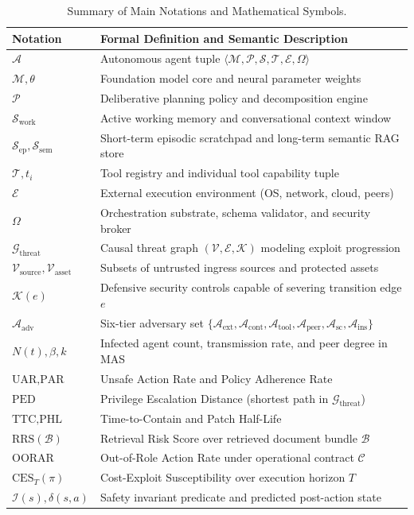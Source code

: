 \begin{table}[t]
\centering
\caption{Summary of Main Notations and Mathematical Symbols.}
\label{tab:nomenclature}
\footnotesize
\begin{tabularx}{\columnwidth}{l X}
\toprule
\textbf{Notation} & \textbf{Formal Definition and Semantic Description} \\
\midrule
$\mathcal{A}$ & Autonomous agent tuple $\langle \mathcal{M}, \mathcal{P}, \mathcal{S}, \mathcal{T}, \mathcal{E}, \Omega \rangle$ \\
$\mathcal{M}, \theta$ & Foundation model core and neural parameter weights \\
$\mathcal{P}$ & Deliberative planning policy and decomposition engine \\
$\mathcal{S}_{\text{work}}$ & Active working memory and conversational context window \\
$\mathcal{S}_{\text{ep}}, \mathcal{S}_{\text{sem}}$ & Short-term episodic scratchpad and long-term semantic RAG store \\
$\mathcal{T}, t_i$ & Tool registry and individual tool capability tuple \\
$\mathcal{E}$ & External execution environment (OS, network, cloud, peers) \\
$\Omega$ & Orchestration substrate, schema validator, and security broker \\
$\mathcal{G}_{\text{threat}}$ & Causal threat graph $(\mathcal{V}, \mathcal{E}, \mathcal{K})$ modeling exploit progression \\
$\mathcal{V}_{\text{source}}, \mathcal{V}_{\text{asset}}$ & Subsets of untrusted ingress sources and protected assets \\
$\mathcal{K}(e)$ & Defensive security controls capable of severing transition edge $e$ \\
$\mathcal{A}_{\text{adv}}$ & Six-tier adversary set $\{\mathcal{A}_{\text{ext}}, \mathcal{A}_{\text{cont}}, \mathcal{A}_{\text{tool}}, \mathcal{A}_{\text{peer}}, \mathcal{A}_{\text{sc}}, \mathcal{A}_{\text{ins}}\}$ \\
$N(t), \beta, k$ & Infected agent count, transmission rate, and peer degree in MAS \\
$\text{UAR}, \text{PAR}$ & Unsafe Action Rate and Policy Adherence Rate \\
$\text{PED}$ & Privilege Escalation Distance (shortest path in $\mathcal{G}_{\text{threat}}$) \\
$\text{TTC}, \text{PHL}$ & Time-to-Contain and Patch Half-Life \\
$\text{RRS}(\mathcal{B})$ & Retrieval Risk Score over retrieved document bundle $\mathcal{B}$ \\
$\text{OORAR}$ & Out-of-Role Action Rate under operational contract $\mathcal{C}$ \\
$\text{CES}_T(\pi)$ & Cost-Exploit Susceptibility over execution horizon $T$ \\
$\mathcal{I}(s), \delta(s, a)$ & Safety invariant predicate and predicted post-action state \\
\bottomrule
\end{tabularx}
\end{table}
